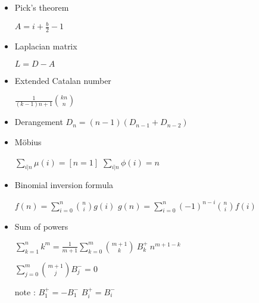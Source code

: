 \begin{itemize}

    \item Pick's theorem

    $A=i+\frac{b}{2}-1$

    \item Laplacian matrix

    $L = D - A$

    \item Extended Catalan number

    $\frac{1}{(k-1)n+1} {kn\choose n}$

    \item Derangement
    $D_n=(n-1)(D_{n-1}+D_{n-2})$

    \item Möbius

    $\sum\limits_{i|n} \mu(i)=[n=1]$
    $\sum\limits_{i|n} \phi(i)=n$

    \item Binomial inversion formula

    $f(n)=\sum\limits_{i=0}^n{n \choose i}g(i)$
    $g(n)=\sum\limits_{i=0}^n(-1)^{n-i}{n \choose i}f(i)$

    \item Sum of powers

    $\sum_{k=1}^{n} k^m=\frac{1}{m+1}\sum_{k=0}^{m}{{m+1}\choose{k}}~B^+_k~n^{m+1-k}$

    $\sum_{j=0}^{m}{m+1\choose j}B^-_j=0$

    note :
    $B^+_1=-B^-_1$
    $B^+_i=B^-_i$

\end{itemize}
